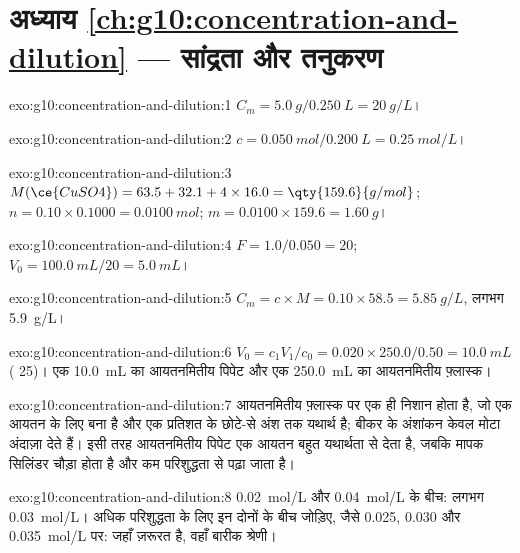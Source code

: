 \section*{अध्याय \ref{ch:g10:concentration-and-dilution} --- सांद्रता और तनुकरण}

\begin{solution}{exo:g10:concentration-and-dilution:1}
$C_m = \qty{5.0}{g} / \qty{0.250}{L} = \qty{20}{g/L}$।
\end{solution}

\begin{solution}{exo:g10:concentration-and-dilution:2}
$c = \qty{0.050}{mol} / \qty{0.200}{L} = \qty{0.25}{mol/L}$।
\end{solution}

\begin{solution}{exo:g10:concentration-and-dilution:3}
$M(\ce{CuSO4}) = 63.5 + 32.1 + 4 \times 16.0 = \qty{159.6}{g/mol}$;
$n = 0.10 \times 0.1000 = \qty{0.0100}{mol}$; $m = 0.0100 \times 159.6 =
\qty{1.60}{g}$।
\end{solution}

\begin{solution}{exo:g10:concentration-and-dilution:4}
$F = 1.0 / 0.050 = 20$; $V_0 = \qty{100.0}{mL} / 20 = \qty{5.0}{mL}$।
\end{solution}

\begin{solution}{exo:g10:concentration-and-dilution:5}
$C_m = c \times M = 0.10 \times 58.5 = \qty{5.85}{g/L}$, लगभग
\qty{5.9}{g/L}।
\end{solution}

\begin{solution}{exo:g10:concentration-and-dilution:6}
$V_0 = c_1 V_1 / c_0 = 0.020 \times 250.0 / 0.50 = \qty{10.0}{mL}$
( 25)। एक \qty{10.0}{mL} का आयतनमितीय पिपेट और एक
\qty{250.0}{mL} का आयतनमितीय फ़्लास्क।
\end{solution}

\begin{solution}{exo:g10:concentration-and-dilution:7}
आयतनमितीय फ़्लास्क पर एक ही निशान होता है, जो एक आयतन के लिए बना है और एक
प्रतिशत के छोटे-से अंश तक यथार्थ है; बीकर के अंशांकन केवल मोटा अंदाज़ा देते हैं।
इसी तरह आयतनमितीय पिपेट एक आयतन बहुत यथार्थता से देता है, जबकि मापक सिलिंडर
चौड़ा होता है और कम परिशुद्धता से
पढ़ा जाता है।
\end{solution}

\begin{solution}{exo:g10:concentration-and-dilution:8}
\qty{0.02}{mol/L} और \qty{0.04}{mol/L} के बीच: लगभग \qty{0.03}{mol/L}।
अधिक परिशुद्धता के लिए इन दोनों के बीच  जोड़िए, जैसे
0.025, 0.030 और \qty{0.035}{mol/L} पर: जहाँ ज़रूरत है, वहाँ बारीक श्रेणी।
\end{solution}

